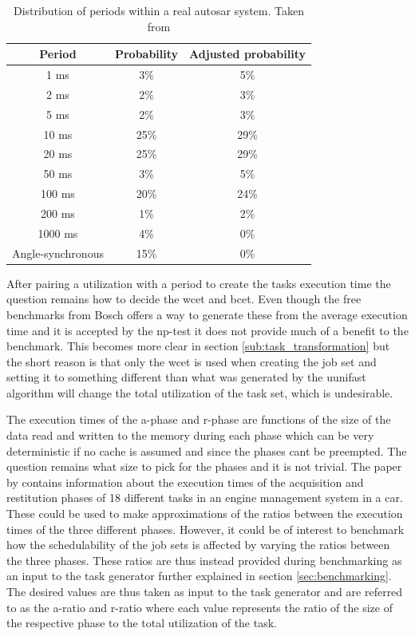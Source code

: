 \documentclass{kththesis}
\begin{document}
\begin{table}
    \centering
    \begin{tabular}{| c | c | c |} 
        \hline
        Period & Probability & Adjusted probability  \\
        \hline
        1 ms & 3\% & 5\% \\
        \hline
        2 ms & 2\% & 3\% \\
        \hline
        5 ms & 2\% & 3\% \\
        \hline
        10 ms & 25\% & 29\% \\
        \hline
        20 ms & 25\% & 29\% \\
        \hline
        50 ms & 3\% & 5\% \\
        \hline
        100 ms & 20\% & 24\% \\
        \hline
        200 ms & 1\% & 2\% \\
        \hline
        1000 ms & 4\% & 0\% \\
        \hline
        Angle-synchronous & 15\% & 0\% \\
        \hline
    \end{tabular}
    \caption{Distribution of periods within a real \acrshort{autosar} system. Taken from \parencite{kramer_real_2015}}
    \label{tab:period_distribution}
\end{table}

After pairing a utilization with a period to create the tasks execution time the question remains
how to decide the \acrshort{wcet} and \acrshort{bcet}. Even though the free benchmarks from Bosch
offers a way to generate these from the average execution time and it is accepted by the
\acrshort{np}-test it does not provide much of a benefit to the benchmark. This becomes more clear
in section \ref{sub:task_transformation} but the short reason is that only the \acrshort{wcet} is
used when creating the job set and setting it to something different than what was generated by the
uunifast algorithm will change the total utilization of the task set, which is undesirable.

The execution times of the \acrshort{a}-phase and \acrshort{r}-phase are functions of the size of
the data read and written to the memory during each phase which can be very deterministic if no
cache is assumed and since the phases cant be preempted. The question remains what size to pick
for the phases and it is not trivial. The paper by \textcite{becker_scheduling_2018}
contains information about the execution times of the acquisition and restitution phases of 18
different tasks in an engine management system in a car. These could be used to make approximations
of the ratios between the execution times of the three different phases. However, it could be of
interest to benchmark how the schedulability of the job sets is affected by varying the ratios
between the three phases. These ratios are thus instead provided during benchmarking as an input to
the task generator further explained in section \ref{sec:benchmarking}. The desired values are thus
taken as input to the task generator and are referred to as the \acrshort{a}-ratio and
\acrshort{r}-ratio where each value represents the ratio of the size of the respective phase to the total
utilization of the task.
\end{document}
